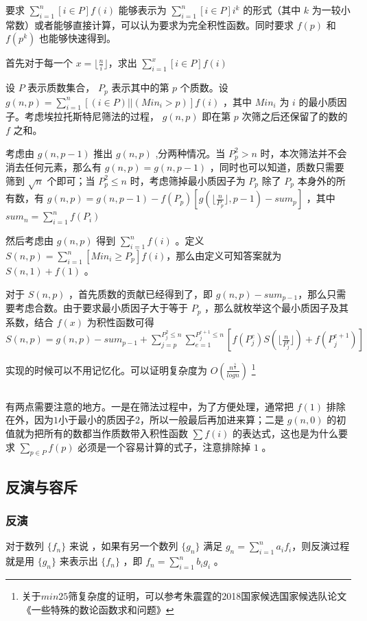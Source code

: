 \documentclass[UTF-8]{ctexart}
\newcommand{\cpp}[1]{\inputminted[bgcolor=bg,breaklines,breakanywhere=true]{c++}{#1}}
\begin{document}
			要求 $\sum _ {i=1}^n [i \in P]f(i)$ 能够表示为 $\sum _ {i=1}^ n[i \in P] i^k$ 的形式（其中 $k$ 为一较小常数）或者能够直接计算，可以认为要求为完全积性函数。同时要求 $f(p)$ 和 $f(p^k)$ 也能够快速得到。 
			
			首先对于每一个 $x=\lfloor \frac{n}{i} \rfloor $，求出 $\sum _ {i=1} ^ x [i \in P]f(i)$
			
			设 $P$ 表示质数集合， $P_p$ 表示其中的第 $p$ 个质数。设 $g(n,p)=\sum_{i=1}^n[(i \in P)||(Min_i>p)]f(i)$ ，其中 $Min_i$ 为 $i$ 的最小质因子。考虑埃拉托斯特尼筛法的过程， $g(n,p)$ 即在第 $p$ 次筛之后还保留了的数的 $f$ 之和。
			
			考虑由 $g(n,p-1)$ 推出 $g(n,p)$ ,分两种情况。当 $P_p^2>n$ 时，本次筛法并不会消去任何元素，那么有 $g(n,p)=g(n,p-1)$ ，同时也可以知道，质数只需要筛到 $\sqrt{n}$ 个即可；当 $P _ p ^ 2 \leq n$ 时，考虑筛掉最小质因子为 $P_p$ 除了 $P_p$ 本身外的所有数，有 $g(n,p)=g(n,p-1)-f(P_p)[g(\lfloor \frac{n}{P_p} \rfloor,p-1)-sum_p]$ ，其中 $sum_n=\sum_{i=1}^n f(P_i)$
			
			然后考虑由 $g(n,p)$ 得到 $\sum_{i=1}^n f(i)$ 。定义 $S(n,p)=\sum_{i=1}^n [Min_i \ge P_p]f(i)$，那么由定义可知答案就为 $S(n,1)+f(1)$ 。
			
			对于 $S(n,p)$ ，首先质数的贡献已经得到了，即 $g(n,p)-sum_{p-1}$，那么只需要考虑合数。由于要求最小质因子大于等于 $P_p$ ，那么就枚举这个最小质因子及其系数，结合 $f(x)$ 为积性函数可得 $S(n,p)=g(n,p)-sum_{p-1}+\sum_{j=p}^{P_j^2\le n}\sum_{e=1}^{P_j^{e+1}\le n}[f(P_j^e)S(\lfloor \frac{n}{P_j^e}\rfloor)+f(P_j^{e+1})]$ 
			
			实现的时候可以不用记忆化。可以证明复杂度为 $O(\frac{n^{\frac{3}{4}}}{logn})$ \footnote{关于$min25$筛复杂度的证明，可以参考朱震霆的2018国家候选国家候选队论文《一些特殊的数论函数求和问题》}
			
			\cpp{code//Math//min25.cpp}
	
			有两点需要注意的地方。一是在筛法过程中，为了方便处理，通常把 $f(1)$ 排除在外，因为$1$小于最小的质因子$2$，所以一般最后再加进来算；二是 $g(n,0)$ 的初值就为把所有的数都当作质数带入积性函数 $\sum f(i)$ 的表达式，这也是为什么要求 $\sum_{p \in P}f(p)$ 必须是一个容易计算的式子，注意排除掉 $1$ 。
		\subsection{反演与容斥}
			\subsubsection{反演}
			对于数列 $\{f_n\}$ 来说	，如果有另一个数列 $\{g_n\}$ 满足 $g_n=\sum_{i=1}^n a_i f_i$，则反演过程就是用 $\{g_n\}$ 来表示出 $\{f_n\}$ ，即 $f_n=\sum_{i=1}^n b_i g_i$ 。
			
\end{document}
